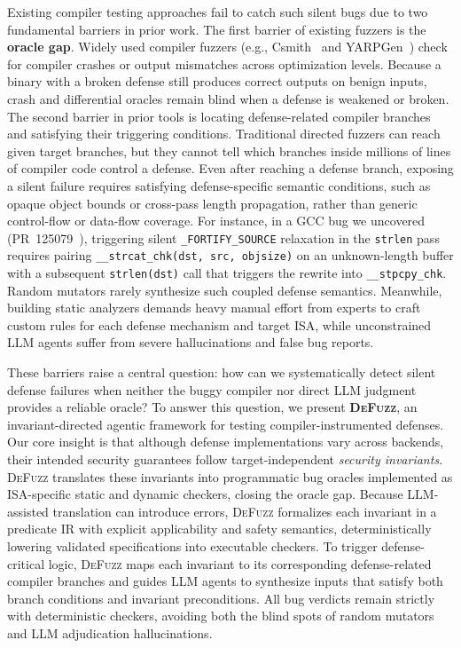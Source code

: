 \documentclass[conference]{IEEEtran}
\begin{document}
Existing compiler testing approaches fail to catch such silent bugs due to two fundamental barriers in prior work. The first barrier of existing fuzzers is the \textbf{oracle gap}. Widely used compiler fuzzers (e.g., Csmith~\cite{yang2011csmith} and YARPGen~\cite{livinskii2020yarpgen}) check for compiler crashes or output mismatches across optimization levels. Because a binary with a broken defense still produces correct outputs on benign inputs, crash and differential oracles remain blind when a defense is weakened or broken. The second barrier in prior tools is locating defense-related compiler branches and satisfying their triggering conditions. Traditional directed fuzzers can reach given target branches, but they cannot tell which branches inside millions of lines of compiler code control a defense. Even after reaching a defense branch, exposing a silent failure requires satisfying defense-specific semantic conditions, such as opaque object bounds or cross-pass length propagation, rather than generic control-flow or data-flow coverage. For instance, in a GCC bug we uncovered (PR~125079~\cite{gccpr125079}), triggering silent \texttt{\_FORTIFY\_SOURCE} relaxation in the \texttt{strlen} pass requires pairing \texttt{\_\_strcat\_chk(dst, src, objsize)} on an unknown-length buffer with a subsequent \texttt{strlen(dst)} call that triggers the rewrite into \texttt{\_\_stpcpy\_chk}. Random mutators rarely synthesize such coupled defense semantics. Meanwhile, building static analyzers demands heavy manual effort from experts to craft custom rules for each defense mechanism and target ISA, while unconstrained LLM agents suffer from severe hallucinations and false bug reports.

These barriers raise a central question: how can we systematically detect silent defense failures when neither the buggy compiler nor direct LLM judgment provides a reliable oracle? To answer this question, we present \textbf{\textsc{DeFuzz}}, an invariant-directed agentic framework for testing compiler-instrumented defenses. Our core insight is that although defense implementations vary across backends, their intended security guarantees follow target-independent \emph{security invariants}. \textsc{DeFuzz} translates these invariants into programmatic bug oracles implemented as ISA-specific static and dynamic checkers, closing the oracle gap. Because LLM-assisted translation can introduce errors, \textsc{DeFuzz} formalizes each invariant in a predicate IR with explicit applicability and safety semantics, deterministically lowering validated specifications into executable checkers. To trigger defense-critical logic, \textsc{DeFuzz} maps each invariant to its corresponding defense-related compiler branches and guides LLM agents to synthesize inputs that satisfy both branch conditions and invariant preconditions. All bug verdicts remain strictly with deterministic checkers, avoiding both the blind spots of random mutators and LLM adjudication hallucinations.
\end{document}
